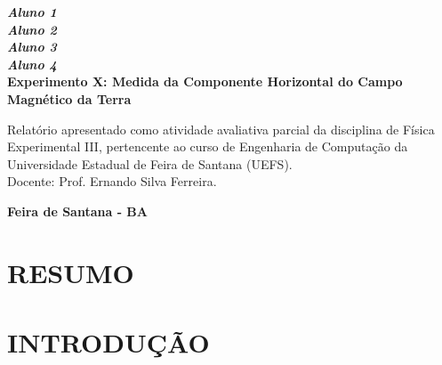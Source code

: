 \documentclass[a4paper,12pt]{article}
\begin{document}
\begin{titlepage}
    \begin{center}
        {\fontsize{14pt}{16pt}\bfseries\itshape Aluno 1}\\[0.1cm]
        {\fontsize{14pt}{16pt}\bfseries\itshape Aluno 2}\\[0.1cm]
        {\fontsize{14pt}{16pt}\bfseries\itshape Aluno 3}\\[0.1cm]
        {\fontsize{14pt}{16pt}\bfseries\itshape Aluno 4}\\[3cm]

        {\fontsize{18pt}{20pt}\bfseries Experimento X: Medida da Componente Horizontal do Campo Magnético da Terra}\\[6cm]

       \begin{flushright}
        \begin{minipage}{0.5\textwidth} %
        \onehalfspacing
        \fontsize{12pt}{15pt}\selectfont
        \justifying
        Relatório apresentado como atividade avaliativa parcial da disciplina de Física Experimental III, pertencente ao curso de Engenharia de Computação da Universidade Estadual de Feira de Santana (UEFS).\\[0.1cm]
        Docente: Prof. Ernando Silva Ferreira.
    \end{minipage}
    \end{flushright}

        \vfill
        {\fontsize{12pt}{14pt}\bfseries Feira de Santana - BA}\\
        {\fontsize{12pt}{14pt}\bfseries \the\year}
    \end{center}
\end{titlepage}

\tableofcontents
\newpage


\section{RESUMO}

\lipsum[1]

\newpage
\section{INTRODUÇÃO}
\label{sec:introducao}
\end{document}
